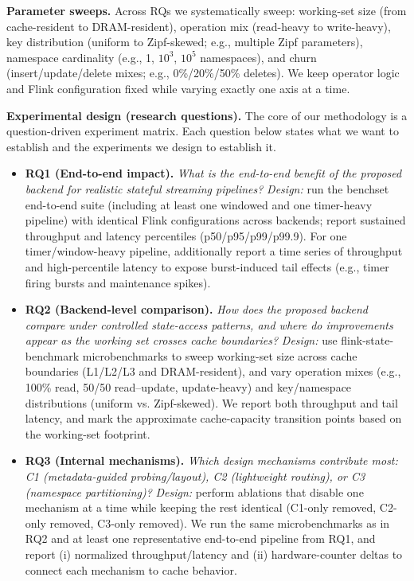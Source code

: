 \documentclass[sigconf]{acmart}
\begin{document}
\textbf{Parameter sweeps.} Across RQs we systematically sweep: working-set size (from cache-resident to DRAM-resident), operation mix (read-heavy to write-heavy), key distribution (uniform to Zipf-skewed; e.g., multiple Zipf parameters), namespace cardinality (e.g., 1, $10^3$, $10^5$ namespaces), and churn (insert/update/delete mixes; e.g., 0\%/20\%/50\% deletes). We keep operator logic and Flink configuration fixed while varying exactly one axis at a time.

\textbf{Experimental design (research questions).} The core of our methodology is a question-driven experiment matrix. Each question below states what we want to establish and the experiments we design to establish it.
\begin{itemize}
  \item \textbf{RQ1 (End-to-end impact).} \emph{What is the end-to-end benefit of the proposed backend for realistic stateful streaming pipelines?}
  \emph{Design:} run the benchset end-to-end suite (including at least one windowed and one timer-heavy pipeline) with identical Flink configurations across backends; report sustained throughput and latency percentiles (p50/p95/p99/p99.9). For one timer/window-heavy pipeline, additionally report a time series of throughput and high-percentile latency to expose burst-induced tail effects (e.g., timer firing bursts and maintenance spikes).

  \item \textbf{RQ2 (Backend-level comparison).} \emph{How does the proposed backend compare under controlled state-access patterns, and where do improvements appear as the working set crosses cache boundaries?}
  \emph{Design:} use flink-state-benchmark microbenchmarks to sweep working-set size across cache boundaries (L1/L2/L3 and DRAM-resident), and vary operation mixes (e.g., 100\% read, 50/50 read--update, update-heavy) and key/namespace distributions (uniform vs. Zipf-skewed). We report both throughput and tail latency, and mark the approximate cache-capacity transition points based on the working-set footprint.

  \item \textbf{RQ3 (Internal mechanisms).} \emph{Which design mechanisms contribute most: C1 (metadata-guided probing/layout), C2 (lightweight routing), or C3 (namespace partitioning)?}
  \emph{Design:} perform ablations that disable one mechanism at a time while keeping the rest identical (C1-only removed, C2-only removed, C3-only removed). We run the same microbenchmarks as in RQ2 and at least one representative end-to-end pipeline from RQ1, and report (i) normalized throughput/latency and (ii) hardware-counter deltas to connect each mechanism to cache behavior.


\end{itemize}
\end{document}
